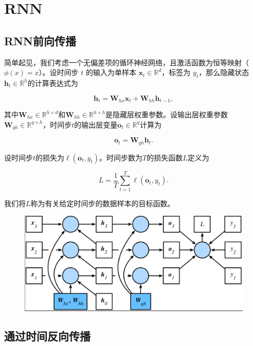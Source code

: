 \section{RNN}
\subsection{RNN前向传播}
简单起见，我们考虑一个无偏差项的循环神经网络，且激活函数为恒等映射（$\phi(x)=x$）。设时间步 $t$ 的输入为单样本 $\boldsymbol{x}_t \in \mathbb{R}^d$，标签为 $y_t$，那么隐藏状态 $\boldsymbol{h}_t \in \mathbb{R}^h$的计算表达式为

$$
\boldsymbol{h}_t = \boldsymbol{W}_{hx} \boldsymbol{x}_t + \boldsymbol{W}_{hh} \boldsymbol{h}_{t-1},
$$

其中$\boldsymbol{W}_{hx} \in \mathbb{R}^{h \times d}$和$\boldsymbol{W}_{hh} \in \mathbb{R}^{h \times h}$是隐藏层权重参数。设输出层权重参数$\boldsymbol{W}_{qh} \in \mathbb{R}^{q \times h}$，时间步$t$的输出层变量$\boldsymbol{o}_t \in \mathbb{R}^q$计算为

$$
\boldsymbol{o}_t = \boldsymbol{W}_{qh} \boldsymbol{h}_{t}.
$$

设时间步$t$的损失为$\ell(\boldsymbol{o}_t, y_t)$。时间步数为$T$的损失函数$L$定义为

$$
L = \frac{1}{T} \sum_{t=1}^T \ell (\boldsymbol{o}_t, y_t).
$$

我们将$L$称为有关给定时间步的数据样本的目标函数。
\begin{figure}[h]
	\centering
	\includegraphics[width=\textwidth]{./img/code/RNN/ttbp.png}
\end{figure}

\subsection{通过时间反向传播}

